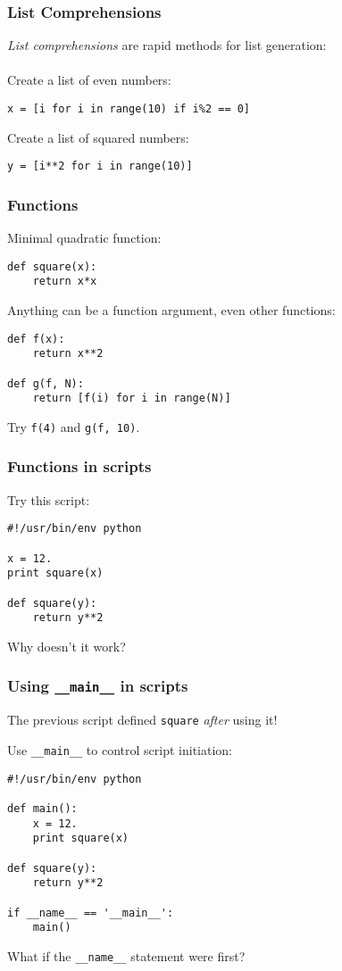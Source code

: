 \documentclass[red]{beamer}
\begin{document}
\begin{frame}[fragile]
    \frametitle{List Comprehensions}

    \textit{List comprehensions} are rapid methods for list generation:
    \\~\\
    Create a list of even numbers:
    \begin{lstlisting}
x = [i for i in range(10) if i%2 == 0]
    \end{lstlisting}

    Create a list of squared numbers:
    \begin{lstlisting}
y = [i**2 for i in range(10)]
    \end{lstlisting}
\end{frame}
\begin{frame}[fragile]
    \frametitle{Functions}

    Minimal quadratic function:
    \begin{lstlisting}
def square(x):
    return x*x
    \end{lstlisting}

    Anything can be a function argument, even other functions:
    \begin{lstlisting}
def f(x):
    return x**2

def g(f, N):
    return [f(i) for i in range(N)]
    \end{lstlisting}
    Try \lstinline|f(4)| and \lstinline|g(f, 10)|.

\end{frame}
\begin{frame}[fragile]
    \frametitle{Functions in scripts}

    Try this script:
    \begin{lstlisting}
#!/usr/bin/env python

x = 12.
print square(x)

def square(y):
    return y**2
    \end{lstlisting}
    Why doesn't it work?
\end{frame}
\begin{frame}[fragile]
    \frametitle{Using \lstinline|__main__| in scripts}

    The previous script defined \lstinline|square| \textit{after} using it!

    Use \lstinline|__main__| to control script initiation:
    \begin{lstlisting}
#!/usr/bin/env python

def main():
    x = 12.
    print square(x)

def square(y):
    return y**2

if __name__ == '__main__':
    main()
    \end{lstlisting}
    What if the \lstinline|__name__| statement were first?
\end{frame}
\end{document}
